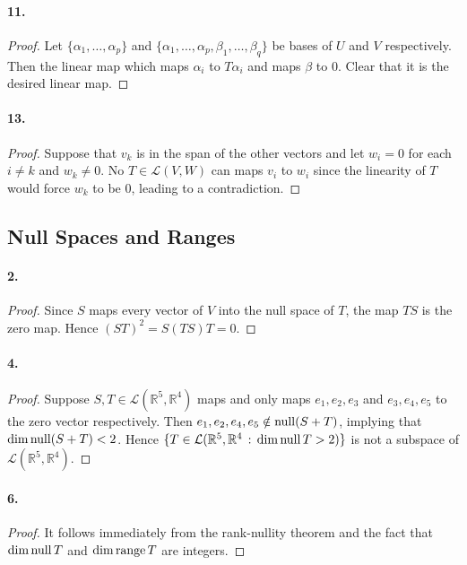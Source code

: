   \paragraph{11.}
  \begin{proof}
    Let $\{\alpha_1,\dots,\alpha_p\}$ and $\{\alpha_1,\dots,\alpha_p,\beta_1,
    \dots,\beta_q\}$ be bases of $U$ and $V$ respectively. Then the linear map 
    which maps $\alpha_i$ to $T\alpha_i$ and maps $\beta$ to $0$. Clear that
    it is the desired linear map. 
  \end{proof}

  \paragraph{13.}
  \begin{proof}
    Suppose that $v_k$ is in the span of the other vectors and let $w_i=0$ for 
    each $i\ne k$ and $w_k\ne 0$. No $T\in\mathcal{L}(V, W)$ can maps $v_i$ to 
    $w_i$ since the linearity of $T$ would force $w_k$ to be $0$, leading to a 
    contradiction.
  \end{proof}


\subsection{Null Spaces and Ranges}
  \paragraph{2.}
  \begin{proof}
    Since $S$ maps every vector of $V$ into the null space of $T$, the map $TS$
    is the zero map. Hence $(ST)^2 = S(TS)T = 0$.
  \end{proof}

  \paragraph{4.}
  \begin{proof}
    Suppose $S,T\in\mathcal{L}(\mathbb{R}^5,\mathbb{R}^4)$ maps and only maps 
    $e_1,e_2,e_3$ and $e_3,e_4,e_5$ to the zero vector respectively. Then $e_1,
    e_2,e_4,e_5\notin\operatorname{null}(S+T)$, implying that $\dim\operatorname{null}(S+T)<2$. Hence $\{T\in
    \mathcal{L}(\mathbb{R}^5,\mathbb{R}^4\,:\,\dim\operatorname{null} T>2)\}$ is not a subspace
    of $\mathcal{L}(\mathbb{R}^5,\mathbb{R}^4)$.
  \end{proof}

  \paragraph{6.}
  \begin{proof}
    It follows immediately from the rank-nullity theorem and the fact that $\dim
    \operatorname{null} T$ and $\dim\operatorname{range} T$ are integers.
  \end{proof}

